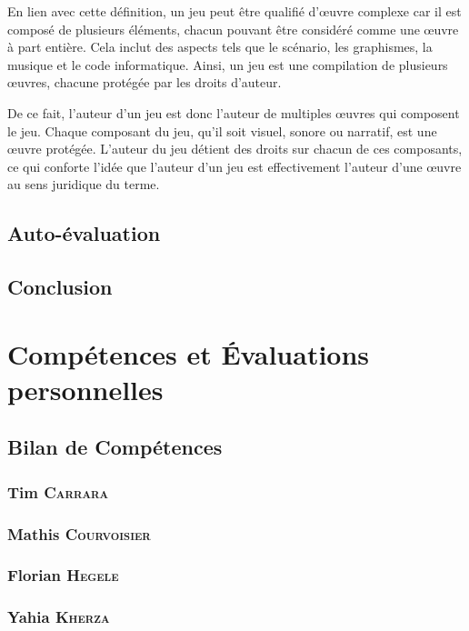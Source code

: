 En lien avec cette définition, un jeu peut être qualifié d'œuvre complexe car il est composé de plusieurs éléments, chacun pouvant être considéré comme une œuvre à part entière. Cela inclut des aspects tels que le scénario, les graphismes, la musique et le code informatique. Ainsi, un jeu est une compilation de plusieurs œuvres, chacune protégée par les droits d'auteur.

De ce fait, l'auteur d'un jeu est donc l'auteur de multiples œuvres qui composent le jeu. Chaque composant du jeu, qu'il soit visuel, sonore ou narratif, est une œuvre protégée. L'auteur du jeu détient des droits sur chacun de ces composants, ce qui conforte l'idée que l'auteur d'un jeu est effectivement l'auteur d'une œuvre au sens juridique du terme.

\section{Auto-évaluation}



\section{Conclusion}


\appendix

\chapter{Compétences et Évaluations personnelles}

\section{Bilan de Compétences}

\subsection*{Tim \textsc{Carrara}}

\subsection*{Mathis \textsc{Courvoisier}}

\subsection*{Florian \textsc{Hegele}}

\subsection*{Yahia \textsc{Kherza}}

